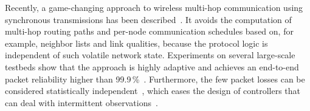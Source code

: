 Recently, a game-changing approach to wireless multi-hop communication using synchronous transmissions has been described~\cite{ferrari2011Glossy,ferrari2012LWB,zimmerling2013modeling}.
It avoids the computation of multi-hop routing paths and per-node communication schedules based on, for example, neighbor lists and link qualities, because the protocol logic is independent of such volatile network state.
Experiments on several large-scale testbeds show that the approach is highly adaptive and achieves an end-to-end packet reliability higher than 99.9\,\%~\cite{ferrari2011Glossy,ferrari2012LWB}.
Furthermore, the few packet losses can be considered statistically independent~\cite{zimmerling2013modeling}, which eases the design of \CPS controllers that can deal with intermittent observations~\cite{sinopoli2004Kalman}.
